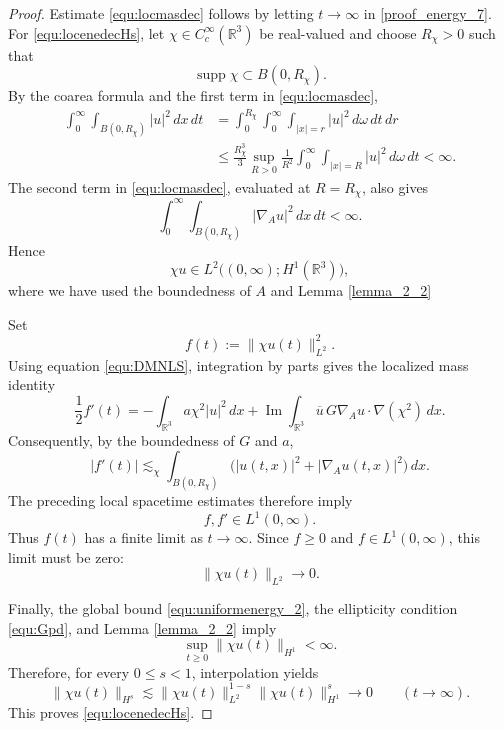\documentclass[10pt,a4paper]{amsart}
\begin{document}
\begin{proof}
Estimate \eqref{equ:locmasdec} follows by letting $t\to\infty$ in \eqref{proof_energy_7}.
For \eqref{equ:locenedecHs},
let $\chi\in C_c^\infty(\mathbb R^3)$ be real-valued and choose
$R_\chi>0$ such that
\[
\operatorname{supp}\chi\subset B(0,R_\chi).
\]
By the coarea formula and the first term in \eqref{equ:locmasdec},
\[
\begin{aligned}
\int_0^\infty\int_{B(0,R_\chi)}|u|^2\,dx\,dt
&=
\int_0^{R_\chi}
\int_0^\infty\int_{|x|=r}|u|^2\,d\omega\,dt\,dr
\\
&\le
\frac{R_\chi^3}{3}
\sup_{R>0}\frac1{R^2}
\int_0^\infty\int_{|x|=R}|u|^2\,d\omega\,dt
<\infty.
\end{aligned}
\]
The second term in \eqref{equ:locmasdec}, evaluated at $R=R_\chi$, also gives
\[
\int_0^\infty\int_{B(0,R_\chi)}
|\nabla_Au|^2\,dx\,dt<\infty.
\]
Hence
\[
\chi u\in L^2\bigl((0,\infty);H^1(\mathbb R^3)\bigr),
\]
where we have used the boundedness of $A$ and Lemma \ref{lemma_2_2}

Set
\[
f(t):=\|\chi u(t)\|_{L^2}^2.
\]
Using equation \eqref{equ:DMNLS}, integration by parts gives the localized
mass identity
\[
\frac12 f'(t)
=
-\int_{\mathbb R^3}a\chi^2|u|^2\,dx
+
\operatorname{Im}\int_{\mathbb R^3}
\overline u\,G\nabla_Au\cdot\nabla(\chi^2)\,dx.
\]
Consequently, by the boundedness of $G$ and $a$,
\[
|f'(t)|
\lesssim_\chi
\int_{B(0,R_\chi)}
\bigl(|u(t,x)|^2+|\nabla_Au(t,x)|^2\bigr)\,dx.
\]
The preceding local spacetime estimates therefore imply
\[
f,f'\in L^1(0,\infty).
\]
Thus $f(t)$ has a finite limit as $t\to\infty$. Since
$f\ge0$ and $f\in L^1(0,\infty)$, this limit must be zero:
\[
\|\chi u(t)\|_{L^2}\longrightarrow0.
\]

Finally, the global bound \eqref{equ:uniformenergy_2}, the ellipticity condition \eqref{equ:Gpd},
and Lemma \ref{lemma_2_2} imply
\[
\sup_{t\ge0}\|\chi u(t)\|_{H^1}<\infty.
\]
Therefore, for every $0\le s<1$, interpolation yields
\[
\|\chi u(t)\|_{H^s}
\lesssim
\|\chi u(t)\|_{L^2}^{1-s}
\|\chi u(t)\|_{H^1}^{s}
\longrightarrow0
\qquad (t\to\infty).
\]
This proves \eqref{equ:locenedecHs}.
\end{proof}
\end{document}
